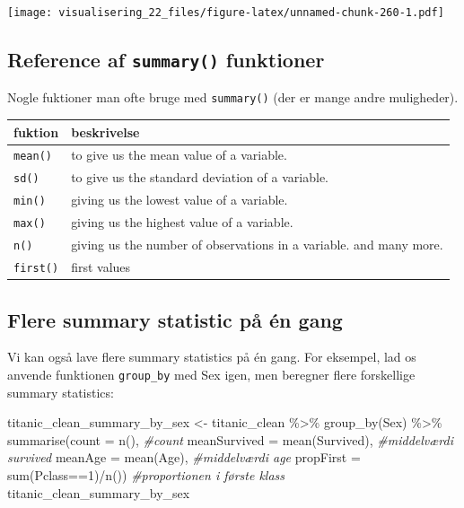 \documentclass[
]{book}
\newenvironment{Shaded}{\begin{snugshade}}{\end{snugshade}}
\newcommand{\AttributeTok}[1]{\textcolor[rgb]{0.77,0.63,0.00}{#1}}
\newcommand{\CommentTok}[1]{\textcolor[rgb]{0.56,0.35,0.01}{\textit{#1}}}
\newcommand{\DecValTok}[1]{\textcolor[rgb]{0.00,0.00,0.81}{#1}}
\newcommand{\FunctionTok}[1]{\textcolor[rgb]{0.00,0.00,0.00}{#1}}
\newcommand{\NormalTok}[1]{#1}
\newcommand{\OtherTok}[1]{\textcolor[rgb]{0.56,0.35,0.01}{#1}}
\newcommand{\SpecialCharTok}[1]{\textcolor[rgb]{0.00,0.00,0.00}{#1}}
\begin{document}
\texttt{[image: visualisering\_22\_files/figure-latex/unnamed-chunk-260-1.pdf]}

\hypertarget{reference-af-summary-funktioner}{%
\subsection{\texorpdfstring{Reference af \texttt{summary()} funktioner}{Reference af summary() funktioner}}\label{reference-af-summary-funktioner}}

Nogle fuktioner man ofte bruge med \texttt{summary()} (der er mange andre muligheder).

\begin{longtable}[]{@{}ll@{}}
\toprule
fuktion & beskrivelse \\
\midrule
\endhead
\texttt{mean()} & to give us the mean value of a variable. \\
\texttt{sd()} & to give us the standard deviation of a variable. \\
\texttt{min()} & giving us the lowest value of a variable. \\
\texttt{max()} & giving us the highest value of a variable. \\
\texttt{n()} & giving us the number of observations in a variable. and many more. \\
\texttt{first()} & first values \\
\bottomrule
\end{longtable}

\hypertarget{flere-summary-statistic-puxe5-uxe9n-gang}{%
\subsection{Flere summary statistic på én gang}\label{flere-summary-statistic-puxe5-uxe9n-gang}}

Vi kan også lave flere summary statistics på én gang. For eksempel, lad os anvende funktionen \texttt{group\_by} med Sex igen, men beregner flere forskellige summary statistics:

\begin{Shaded}
\begin{Highlighting}[]
\NormalTok{titanic\_clean\_summary\_by\_sex }\OtherTok{\textless{}{-}}\NormalTok{ titanic\_clean }\SpecialCharTok{\%\textgreater{}\%}  
  \FunctionTok{group\_by}\NormalTok{(Sex) }\SpecialCharTok{\%\textgreater{}\%} 
  \FunctionTok{summarise}\NormalTok{(}\AttributeTok{count =} \FunctionTok{n}\NormalTok{(),                    }\CommentTok{\#count}
            \AttributeTok{meanSurvived =} \FunctionTok{mean}\NormalTok{(Survived),  }\CommentTok{\#middelværdi survived}
            \AttributeTok{meanAge =} \FunctionTok{mean}\NormalTok{(Age),            }\CommentTok{\#middelværdi age}
            \AttributeTok{propFirst =} \FunctionTok{sum}\NormalTok{(Pclass}\SpecialCharTok{==}\DecValTok{1}\NormalTok{)}\SpecialCharTok{/}\FunctionTok{n}\NormalTok{()) }\CommentTok{\#proportionen i første klass}
\NormalTok{titanic\_clean\_summary\_by\_sex}
\end{Highlighting}
\end{Shaded}
\end{document}
